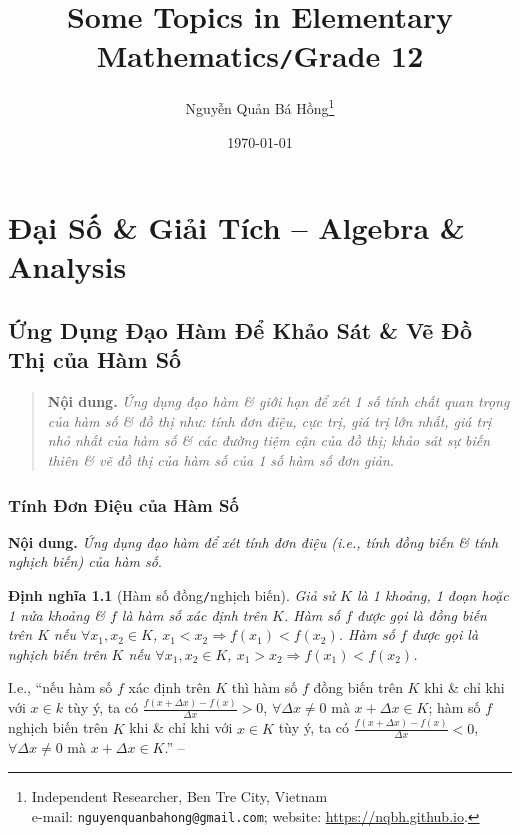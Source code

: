 \documentclass[oneside]{book}
\title{Some Topics in Elementary Mathematics\texttt{/}Grade 12}
\author{Nguyễn Quản Bá Hồng\footnote{Independent Researcher, Ben Tre City, Vietnam\\e-mail: \texttt{nguyenquanbahong@gmail.com}; website: \url{https://nqbh.github.io}.}}
\date{\today}
\numberwithin{equation}{section}
\newtheorem{dinhnghia}{Định nghĩa}[section]
\begin{document}
\frontmatter
\maketitle
\setcounter{secnumdepth}{4}
\setcounter{tocdepth}{3}
\tableofcontents
\newpage


\mainmatter

\part{Đại Số \& Giải Tích -- Algebra \& Analysis}

\chapter{Ứng Dụng Đạo Hàm Để Khảo Sát \& Vẽ Đồ Thị của Hàm Số}

\begin{quotation}
	\textbf{Nội dung.} \textit{Ứng dụng đạo hàm \& giới hạn để xét 1 số tính chất quan trọng của hàm số \& đồ thị như: tính đơn điệu, cực trị, giá trị lớn nhất, giá trị nhỏ nhất của hàm số \& các đường tiệm cận của đồ thị; khảo sát sự biến thiên \& vẽ đồ thị của hàm số của 1 số hàm số đơn giản}.
\end{quotation}

\section{Tính Đơn Điệu của Hàm Số}
\textbf{Nội dung.} \textit{Ứng dụng đạo hàm để xét tính \emph{đơn điệu} (i.e., tính \emph{đồng biến} \& tính \emph{nghịch biến}) của hàm số}.

\begin{dinhnghia}[Hàm số đồng\texttt{/}nghịch biến]
	Giả sử $K$ là 1 khoảng, 1 đoạn hoặc 1 nửa khoảng \& $f$ là hàm số xác định trên $K$. Hàm số $f$ được gọi là \emph{đồng biến} trên $K$ nếu $\forall x_1,x_2\in K$, $x_1 < x_2\Rightarrow f(x_1) < f(x_2)$. Hàm số $f$ được gọi là \emph{nghịch biến} trên $K$ nếu $\forall x_1,x_2\in K$, $x_1 > x_2\Rightarrow f(x_1) < f(x_2)$.
\end{dinhnghia}
I.e., ``nếu hàm số $f$ xác định trên $K$ thì hàm số $f$ đồng biến trên $K$ khi \& chỉ khi với $x\in k$ tùy ý, ta có $\frac{f(x + \Delta x) - f(x)}{\Delta x} > 0$, $\forall\Delta x\ne 0$ mà $x + \Delta x\in K$; hàm số $f$ nghịch biến trên $K$ khi \& chỉ khi với $x\in K$ tùy ý, ta có $\frac{f(x + \Delta x) - f(x)}{\Delta x} < 0$, $\forall\Delta x\ne 0$ mà $x + \Delta x\in K$.'' -- \cite[p. 4]{SGK_Toan_12_giai_tich_nang_cao}
\end{document}
